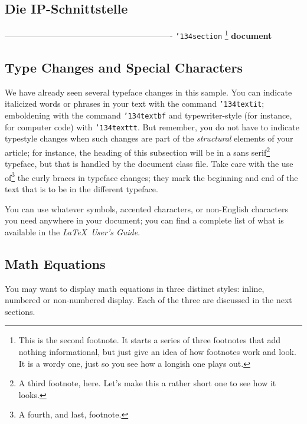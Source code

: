 \documentclass{template}
\begin{document}
\subsection{Die IP-Schnittstelle}






-------------------------------------------------------------
\texttt{{\char'134}section}
\footnote{This is the second footnote.  It
starts a series of three footnotes that add nothing
informational, but just give an idea of how footnotes work
and look. It is a wordy one, just so you see
how a longish one plays out.}
\textbf{document} 


\subsection{Type Changes and {\subsecit Special} Characters}
We have already seen several typeface changes in this sample.  You
can indicate italicized words or phrases in your text with
the command \texttt{{\char'134}textit}; emboldening with the
command \texttt{{\char'134}textbf}
and typewriter-style (for instance, for computer code) with
\texttt{{\char'134}texttt}.  But remember, you do not
have to indicate typestyle changes when such changes are
part of the \textit{structural} elements of your
article; for instance, the heading of this subsection will
be in a sans serif\footnote{A third footnote, here.
Let's make this a rather short one to
see how it looks.} typeface, but that is handled by the
document class file. Take care with the use
of\footnote{A fourth, and last, footnote.}
the curly braces in typeface changes; they mark
the beginning and end of
the text that is to be in the different typeface.

You can use whatever symbols, accented characters, or
non-English characters you need anywhere in your document;
you can find a complete list of what is
available in the \textit{\LaTeX\
User's Guide}\cite{Lamport:LaTeX}.

\subsection{Math Equations}
You may want to display math equations in three distinct styles:
inline, numbered or non-numbered display.  Each of
the three are discussed in the next sections.
\end{document}

